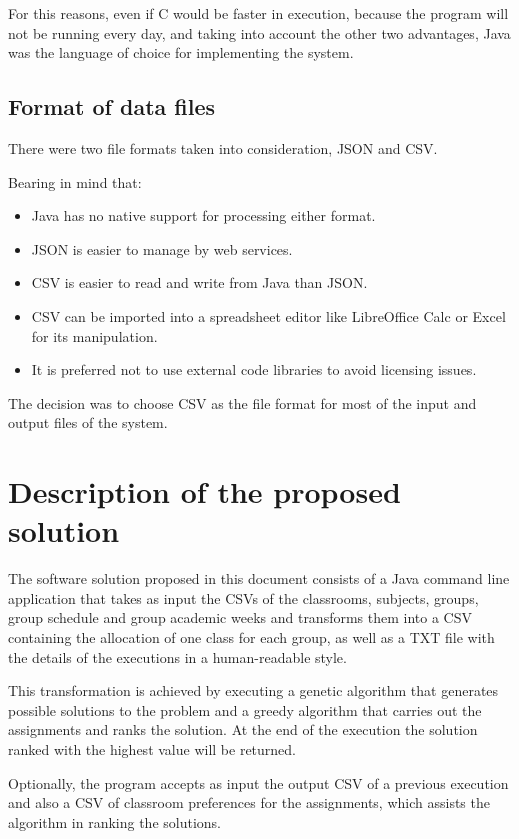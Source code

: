 For this reasons, even if C would be faster in execution, because the program will not be running every day, and taking into account the other two advantages, Java was the language of choice for implementing the system.

\subsection{Format of data files}

There were two file formats taken into consideration, JSON and CSV.

Bearing in mind that:

\begin{itemize}
    \item Java has no native support for processing either format.
    \item JSON is easier to manage by web services.
    \item CSV is easier to read and write from Java than JSON.
    \item CSV can be imported into a spreadsheet editor like LibreOffice Calc or Excel for its manipulation.
    \item It is preferred not to use external code libraries to avoid licensing issues.
\end{itemize}

The decision was to choose CSV as the file format for most of the input and output files of the system.

\section{Description of the proposed solution}

The software solution proposed in this document consists of a Java command line application that takes as input the CSVs of the classrooms, subjects, groups, group schedule and group academic weeks and transforms them into a CSV containing the allocation of one class for each group, as well as a TXT file with the details of the executions in a human-readable style.

This transformation is achieved by executing a genetic algorithm that generates possible solutions to the problem and a greedy algorithm that carries out the assignments and ranks the solution. At the end of the execution the solution ranked with the highest value will be returned.

Optionally, the program accepts as input the output CSV of a previous execution and also a CSV of classroom preferences for the assignments, which assists the algorithm in ranking the solutions.

